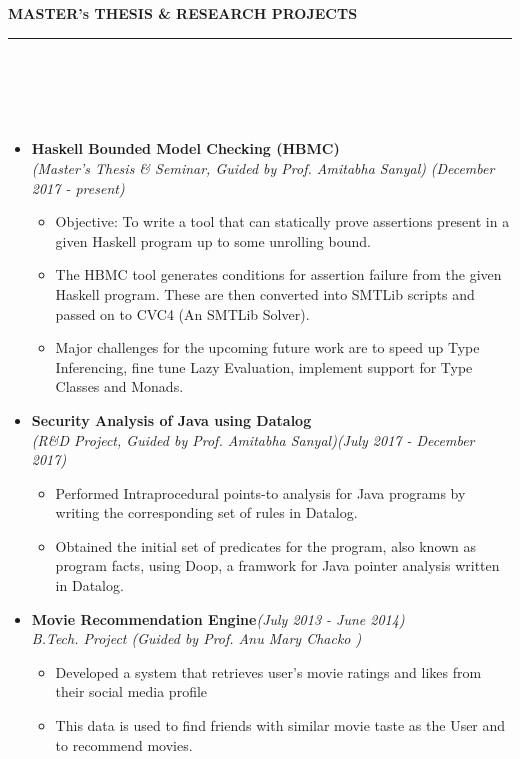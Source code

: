 \documentclass[a4paper,10pt]{article}
\newcommand{\isep}{-2 pt}
\newcommand{\lsep}{-0.5cm}
\newcommand{\resheading}[1]{{\small
        {
            \begin{minipage}
                {0.975\textwidth}\textbf{{\textsc{#1 \vphantom{p\^{E}} }}}
                \\[-0.3cm]
                \hrule
            \end{minipage}
            \\[-0.5cm]
        }
 }}
\begin{document}
\resheading{\textbf{\large MASTER's THESIS \& RESEARCH PROJECTS}}\\[\lsep]
\\[-0.4cm]
\begin{itemize}
\item \textbf{ Haskell Bounded Model Checking (HBMC)} \\ \emph{(Master's Thesis \& Seminar, Guided by Prof. Amitabha Sanyal)} \hfill {\emph{(December 2017 - present)}}
    \\ [-0.6cm]
    \begin{itemize}\itemsep \isep
    \item Objective: To write a tool that can statically prove assertions present in a given Haskell program up to some unrolling bound.
    \item The HBMC tool generates conditions for assertion failure from the given Haskell program.  These are then converted into SMTLib scripts and passed on to CVC4 (An SMTLib Solver).
    \item Major challenges for the upcoming future work are to speed up Type Inferencing,  fine tune Lazy Evaluation, implement support for Type Classes and Monads.
    \end{itemize}

\item \textbf{Security Analysis of Java using Datalog}
\\ {\emph{(R\&D Project, Guided by Prof. Amitabha Sanyal)}}\hfill{\emph{(July 2017 - December 2017)}}
    \\ [-0.6cm]
    \begin{itemize}\itemsep \isep
    \item Performed Intraprocedural points-to analysis for Java programs by writing the corresponding set of rules in Datalog.
    \item Obtained the initial set of predicates for the program, also known as program facts, using Doop, a framwork for Java pointer analysis written in Datalog.
    \end{itemize}

\item \textbf{Movie Recommendation Engine}\hfill{\emph{(July 2013 - June 2014)}}\\
 {\emph{B.Tech. Project (Guided by Prof. Anu Mary Chacko )}} 
    \\[-0.6cm]
 	\begin{itemize}\itemsep \isep
	\item Developed a system that retrieves user's movie ratings and likes from their social media profile
  	\item This data is used to find friends with similar movie taste as the User and to recommend movies.
	\end{itemize}
\end{itemize}	
\vspace{0.1cm}
\end{document}
